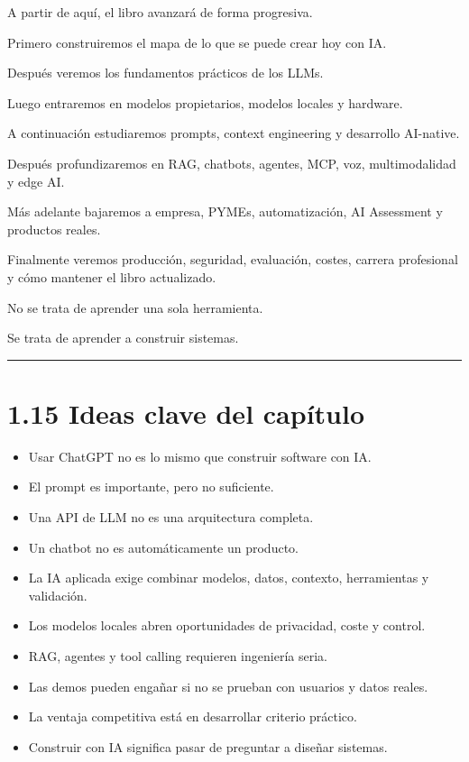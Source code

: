 A partir de aquí, el libro avanzará de forma progresiva.

Primero construiremos el mapa de lo que se puede crear hoy con IA.

Después veremos los fundamentos prácticos de los LLMs.

Luego entraremos en modelos propietarios, modelos locales y hardware.

A continuación estudiaremos prompts, context engineering y desarrollo
AI-native.

Después profundizaremos en RAG, chatbots, agentes, MCP, voz,
multimodalidad y edge AI.

Más adelante bajaremos a empresa, PYMEs, automatización, AI Assessment y
productos reales.

Finalmente veremos producción, seguridad, evaluación, costes, carrera
profesional y cómo mantener el libro actualizado.

No se trata de aprender una sola herramienta.

Se trata de aprender a construir sistemas.

\begin{center}\rule{0.5\linewidth}{0.5pt}\end{center}

\section{1.15 Ideas clave del
capítulo}\label{ideas-clave-del-capuxedtulo}

\begin{itemize}
\tightlist
\item
  Usar ChatGPT no es lo mismo que construir software con IA.
\item
  El prompt es importante, pero no suficiente.
\item
  Una API de LLM no es una arquitectura completa.
\item
  Un chatbot no es automáticamente un producto.
\item
  La IA aplicada exige combinar modelos, datos, contexto, herramientas y
  validación.
\item
  Los modelos locales abren oportunidades de privacidad, coste y
  control.
\item
  RAG, agentes y tool calling requieren ingeniería seria.
\item
  Las demos pueden engañar si no se prueban con usuarios y datos reales.
\item
  La ventaja competitiva está en desarrollar criterio práctico.
\item
  Construir con IA significa pasar de preguntar a diseñar sistemas.
\end{itemize}

